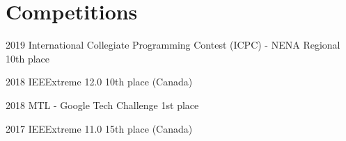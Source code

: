 \documentclass[]{friggeri-cv} %
\begin{document}

\clearpage

\section{Competitions}
\begin{entrylist}
	\vspace{-7pt}
																											
																											
	\entry
	{2019}
	{International Collegiate Programming Contest (ICPC) - NENA Regional}
	{10th place}
	{}
	\vspace{-7pt}
																											
																											
	\entry
	{2018}
	{IEEExtreme 12.0}
	{10th place (Canada)}
	{}
	\vspace{-7pt}
																											
																											
	\entry
	{2018}
	{MTL - Google Tech Challenge}
	{1st place}
	{}
	\vspace{-7pt}
																											
																											
	\entry
	{2017}
	{IEEExtreme 11.0}
	{15th place (Canada)}
	{}
	\vspace{-7pt}
																											
																											
\end{entrylist}

\end{document}
